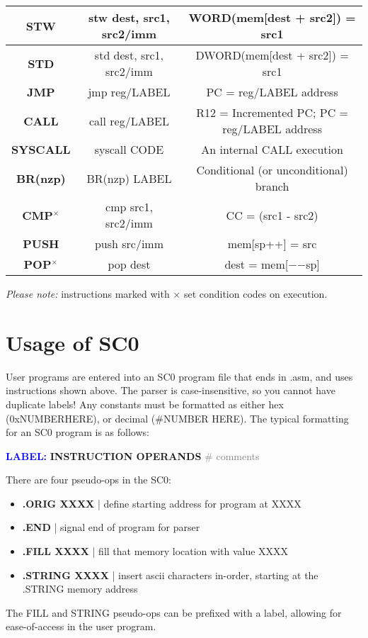 \documentclass{article}
\newcommand*\scc[1]{{#1}\textbf{$^\times$}}
\begin{document}
\begin{tableofcontents}
\begin{center}
\begin{tabular}{|c|c|c|}
\textbf{STW} & stw dest, src1, src2/imm & WORD(mem[dest + src2]) = src1 \\
\hline
\textbf{STD} & std dest, src1, src2/imm & DWORD(mem[dest + src2]) = src1 \\
\hline
\textbf{JMP} & jmp reg/LABEL & PC = reg/LABEL address \\
\hline
\textbf{CALL} & call reg/LABEL & R12 = Incremented PC; PC = reg/LABEL address \\
\hline
\textbf{SYSCALL} & syscall CODE & An internal CALL execution \\
\hline
\textbf{BR(nzp)} & BR(nzp) LABEL & Conditional (or unconditional) branch \\
\hline
\textbf{\scc{CMP}} & cmp src1, src2/imm & CC = (src1 - src2) \\
\hline
\textbf{PUSH} & push src/imm & mem[sp++] = src \\
\hline
\textbf{\scc{POP}} & pop dest & dest = mem[$-$$-$sp] \\
\hline
\end{tabular}
\end{center}
\textit{\Large Please note:} instructions marked with $\times$ set condition codes on execution.
\section{\Huge Usage of SC0}
\begin{Large}
User programs are entered into an SC0 program file that ends in .asm, 
and uses instructions shown above. The parser is case-insensitive,
so you cannot have duplicate labels! Any constants must be formatted
as either hex (0xNUMBERHERE), or decimal (\#NUMBER HERE).
The typical formatting for an SC0 program is as follows:
\begin{center}
\textcolor{blue}{\textbf{LABEL:}} \textbf{INSTRUCTION OPERANDS} \textcolor{gray}{ \# comments}
\end{center}
There are four pseudo-ops in the SC0:
\begin{itemize}
    \item \textbf{.ORIG XXXX} | define starting address for program at XXXX
    \item \textbf{.END} | signal end of program for parser
    \item \textbf{.FILL XXXX} | fill that memory location with value XXXX
    \item \textbf{.STRING XXXX} | insert ascii characters in-order, starting at the .STRING memory address
\end{itemize}
The FILL and STRING pseudo-ops can be prefixed with a label, allowing for ease-of-access
in the user program.


\end{Large}
\end{tableofcontents}
\end{document}
